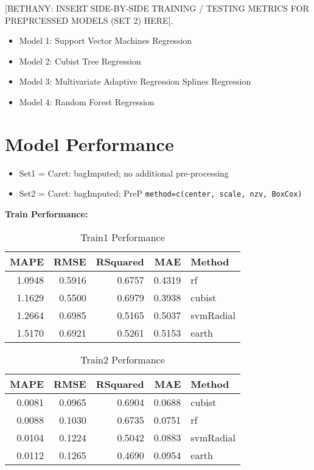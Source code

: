 \documentclass[]{report}
\providecommand{\tightlist}{%
  \setlength{\itemsep}{0pt}\setlength{\parskip}{0pt}}
\begin{document}
{[}BETHANY: INSERT SIDE-BY-SIDE TRAINING / TESTING METRICS FOR
PREPRCESSED MODELS (SET 2) HERE{]}.

\begin{itemize}
\tightlist
\item
  Model 1: Support Vector Machines Regression
\item
  Model 2: Cubist Tree Regression
\item
  Model 3: Multivariate Adaptive Regression Splines Regression
\item
  Model 4: Random Forest Regression
\end{itemize}

\hypertarget{model-performance}{%
\chapter{Model Performance}\label{model-performance}}

\begin{itemize}
\tightlist
\item
  Set1 = Caret: bagImputed; no additional pre-processing\\
\item
  Set2 = Caret: bagImputed; PreP
  \texttt{method=c(\textquotesingle{}center\textquotesingle{},\ \textquotesingle{}scale\textquotesingle{},\ \textquotesingle{}nzv\textquotesingle{},\ \textquotesingle{}BoxCox\textquotesingle{})}
\end{itemize}

\textbf{Train Performance:}

\begin{table}[H]

\caption{\label{tab:unnamed-chunk-6}Train1 Performance}
\centering
\fontsize{8}{10}\selectfont
\begin{tabular}[t]{rrrrl}
\toprule
MAPE & RMSE & RSquared & MAE & Method\\
\midrule
\rowcolor{gray!6}  1.0948 & 0.5916 & 0.6757 & 0.4319 & rf\\
1.1629 & 0.5500 & 0.6979 & 0.3938 & cubist\\
\rowcolor{gray!6}  1.2664 & 0.6985 & 0.5165 & 0.5037 & svmRadial\\
1.5170 & 0.6921 & 0.5261 & 0.5153 & earth\\
\bottomrule
\end{tabular}
\end{table}

\begin{table}[H]

\caption{\label{tab:unnamed-chunk-6}Train2 Performance}
\centering
\fontsize{8}{10}\selectfont
\begin{tabular}[t]{rrrrl}
\toprule
MAPE & RMSE & RSquared & MAE & Method\\
\midrule
\rowcolor{gray!6}  0.0081 & 0.0965 & 0.6904 & 0.0688 & cubist\\
0.0088 & 0.1030 & 0.6735 & 0.0751 & rf\\
\rowcolor{gray!6}  0.0104 & 0.1224 & 0.5042 & 0.0883 & svmRadial\\
0.0112 & 0.1265 & 0.4690 & 0.0954 & earth\\
\bottomrule
\end{tabular}
\end{table}
\end{document}
